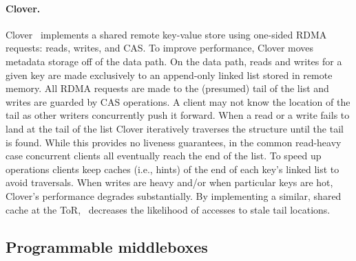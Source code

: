 
\paragraph{Clover.}

Clover~\cite{clover} implements a shared remote key-value store using
one-sided RDMA requests: reads, writes, and CAS.  To improve
performance, Clover moves metadata storage off of the data path. On
the data path, reads and writes for a given key are made exclusively
to an append-only linked list stored in remote memory. All RDMA
requests are made to the (presumed) tail of the list and writes are
guarded by CAS operations. A client may not know the location of the
tail as other writers concurrently push it forward. When a read or a
write fails to land at the tail of the list Clover iteratively
traverses the structure until the tail is found. While this provides
no liveness guarantees, in the common read-heavy case concurrent
clients all eventually reach the end of the list. To speed up
operations clients keep caches (i.e., hints) of the end of each key's
linked list to avoid traversals. When writes are heavy and/or when
particular keys are hot, Clover's performance degrades substantially.
By implementing a similar, shared cache at the ToR, \sword\ 
decreases the likelihood of accesses to stale tail locations.



\subsection{Programmable middleboxes}

